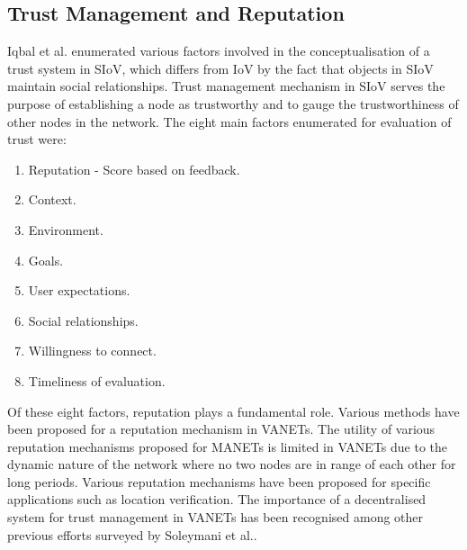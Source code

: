 \documentclass[journal]{IEEEtran}
\begin{document}
\subsection{Trust Management and Reputation}
\label{sec:RV:trust&Reputation}
Iqbal et al. \cite{c:trustInSIoV} enumerated various factors involved in the conceptualisation of a trust system in SIoV, which differs from IoV by the fact that objects in SIoV maintain social relationships. Trust management mechanism in SIoV serves the purpose of establishing a node as trustworthy and to gauge the trustworthiness of other nodes in the network. The eight main factors enumerated for evaluation of trust were:
	\begin{enumerate}
		\item Reputation - Score based on feedback.
		\item Context.
		\item Environment.
		\item Goals.
		\item User expectations.
		\item Social relationships.
		\item Willingness to connect.
		\item Timeliness of evaluation. 
	\end{enumerate}
Of these eight factors, reputation plays a fundamental role. Various methods have been proposed for a reputation mechanism in VANETs. The utility of various reputation mechanisms proposed for MANETs is limited in VANETs due to the dynamic nature of the network where no two nodes are in range of each other for long periods. Various reputation mechanisms have been proposed for specific applications such as location verification\cite{c:positionVerificationRepMech}. The importance of a decentralised system for trust management in VANETs\cite{c:Huang_decentrTrustMechVANETS} has been recognised among other previous efforts surveyed by Soleymani et al.\cite{c:trustinVANETsurvey}.
\end{document}
